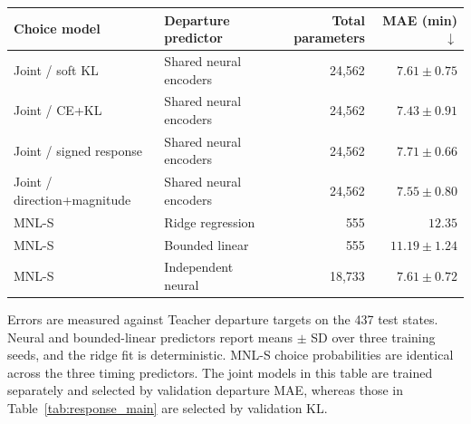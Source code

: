 \begin{resulttable}
\centering\small
\caption{Departure prediction under a common selection criterion (validation MAE).}
\label{tab:timing_main}
\setlength{\tabcolsep}{4pt}
\renewcommand{\arraystretch}{1.12}
\begin{tabular*}{\linewidth}{@{\extracolsep{\fill}}llrr@{}}
\toprule
Choice model & Departure predictor & Total parameters & MAE (min) $\downarrow$ \\
\midrule
Joint / soft KL & Shared neural encoders & 24,562 & $7.61\pm0.75$ \\
Joint / CE+KL & Shared neural encoders & 24,562 & $7.43\pm0.91$ \\
Joint / signed response & Shared neural encoders & 24,562 & $7.71\pm0.66$ \\
Joint / direction+magnitude & Shared neural encoders & 24,562 & $7.55\pm0.80$ \\
\midrule
MNL-S & Ridge regression & 555 & $12.35$ \\
MNL-S & Bounded linear & 555 & $11.19\pm1.24$ \\
MNL-S & Independent neural & 18,733 & $7.61\pm0.72$ \\
\bottomrule
\end{tabular*}
\par\smallskip\begin{minipage}{\linewidth}\footnotesize
Errors are measured against Teacher departure targets on the 437 test states. Neural and bounded-linear predictors report means $\pm$ SD over three training seeds, and the ridge fit is deterministic. MNL-S choice probabilities are identical across the three timing predictors. The joint models in this table are trained separately and selected by validation departure MAE, whereas those in Table~\ref{tab:response_main} are selected by validation KL.
\end{minipage}
\end{resulttable}
